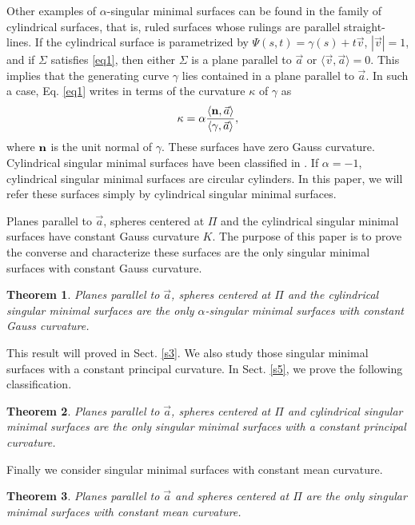 \documentclass{birkjour}
\newtheorem{thm}{Theorem}[section]
\theoremstyle{definition}
\theoremstyle{remark}
\numberwithin{equation}{section}
\begin{document}
Other examples of $\alpha$-singular minimal surfaces can be found in the family of  cylindrical surfaces, that is, ruled surfaces whose rulings are parallel straight-lines. If the cylindrical surface is parametrized by $\Psi(s,t)=\gamma(s)+t\vec{v}$, $|\vec{v}|=1$, and if $\Sigma$ satisfies \eqref{eq1}, then either $\Sigma$ is a plane parallel to $\vec{a}$ or $\langle \vec{v},\vec{a}\rangle=0$. This implies that the generating curve $\gamma$ lies contained in a plane parallel to $\vec{a}$. In such a case, Eq. \eqref{eq1} writes in terms of the curvature $\kappa$ of $\gamma$ as
 \begin{equation}\label{eq2}
 \kappa= \alpha \frac{\langle{\bf n},\vec{a}\rangle}{\langle\gamma,\vec{a}\rangle},
 \end{equation}
where ${\bf n}$ is the unit normal of $\gamma$.  These surfaces have zero   Gauss curvature. Cylindrical singular minimal surfaces have been classified in \cite{dl,lo1}. If $\alpha=-1$, cylindrical singular minimal surfaces are circular cylinders. In this paper, we will refer these surfaces simply by cylindrical singular minimal surfaces.


Planes parallel to $\vec{a}$,  spheres centered at $\Pi$ and the cylindrical singular minimal surfaces  have   constant Gauss curvature $K$. The purpose of this paper is to prove the converse and characterize these surfaces are the only singular minimal surfaces with constant Gauss curvature. 
   

\begin{thm} \label{t1}
Planes parallel to $\vec{a}$,  spheres centered at $\Pi$ and the cylindrical singular minimal surfaces are the only $\alpha$-singular minimal surfaces with   constant Gauss curvature. 
\end{thm}
This result will proved in Sect. \ref{s3}.  We also study those singular minimal surfaces with a constant principal curvature.  In Sect. \ref{s5}, we prove the following classification. 

\begin{thm} \label{t22} Planes parallel to $\vec{a}$, spheres centered at $\Pi$ and cylindrical singular minimal surfaces      are the only  singular minimal surfaces with a constant principal curvature.   
\end{thm}

Finally we consider  singular minimal surfaces with constant mean curvature.

\begin{thm} \label{t3}  Planes parallel to $\vec{a}$ and spheres centered at $\Pi$ are the only   singular minimal surfaces with constant mean curvature.   
\end{thm}
\end{document}
